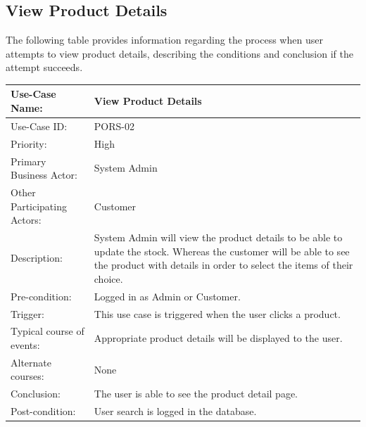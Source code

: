 \subsection{View Product Details}
The following table provides information regarding the process when user attempts to view product details, describing the conditions and conclusion if the attempt succeeds. 
\begin{center}
    \begin{tabular}{ @{}|p{5cm}||p{7cm}|  }
    \hline
    Use-Case Name: & View Product Details  \\ \hline
    Use-Case ID: & PORS-02 \\ \hline
    Priority: & High \\ \hline
    Primary Business Actor: & System Admin \\ \hline
    Other Participating Actors: & Customer \\ \hline
    Description: & System Admin will view the product details to be able to update the stock. Whereas the customer will be able to see the product with details in order to select the items of their choice. \\ \hline
    Pre-condition: & Logged in as Admin or Customer.  \\ \hline
    Trigger: & This use case is triggered when the user clicks a product. \\ \hline
    Typical course of events: & Appropriate product details will be displayed to the user. \\ \hline
    Alternate courses: & None \\ \hline
    Conclusion: &  The user is able to see the product detail page.\\ \hline
    Post-condition: & User search is logged in the database.  \\ \hline
    \end{tabular}
\end{center}

